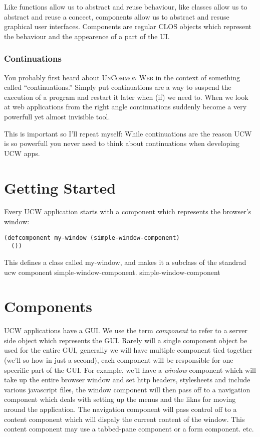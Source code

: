 \documentclass[a4paper]{article}
\newcommand{\ucw}{\textsc{UCW}}
\newcommand{\UCW}{\textsc{UnCommon Web}}
\begin{document}
Like functions allow us to abstract and reuse behaviour, like classes
allow us to abstract and reuse a concect, components allow us to
abstract and resuse graphical user interfaces. Components are regular
CLOS objects which represent the behaviour and the appearence of a
part of the UI.

\subsubsection{Continuations}

You probably first heard about \UCW{} in the context of something
called ``continuations.'' Simply put continuations are a way to
suspend the execution of a program and restart it later when (if) we
need to. When we look at web applications from the right angle
continuations suddenly become a very powerfull yet almost invisible
tool.

This is important so I'll repeat myself: While continuations are the
reason \ucw{} is so powerfull you never need to think about
continuations when developing \ucw{} apps.

\section{Getting Started}

Every \ucw{} application starts with a component which represents the
browser's window:

\begin{verbatim}
(defcomponent my-window (simple-window-component)
  ())
\end{verbatim}

This defines a class called my-window, and makes it a subclass of the
standrad ucw component simple-window-component. simple-window-component

\section{Components}

\ucw{} applications have a GUI. We use the term \textit{component} to
refer to a server side object which represents the GUI. Rarely will a
single component object be used for the entire GUI, generally we will
have multiple component tied together (we'll so how in just a second),
each component will be responsible for one specrific part of the
GUI. For example, we'll have a \textit{window} component which will
take up the entire browser window and set http headers, stylesheets
and include various javascript files, the window component will then
pass off to a navigation component which deals with setting up the
menus and the likns for moving around the application. The navigation
component will pass control off to a content component which will
dispaly the current content of the window. This content component may
use a tabbed-pane component or a form component. etc.
\end{document}
